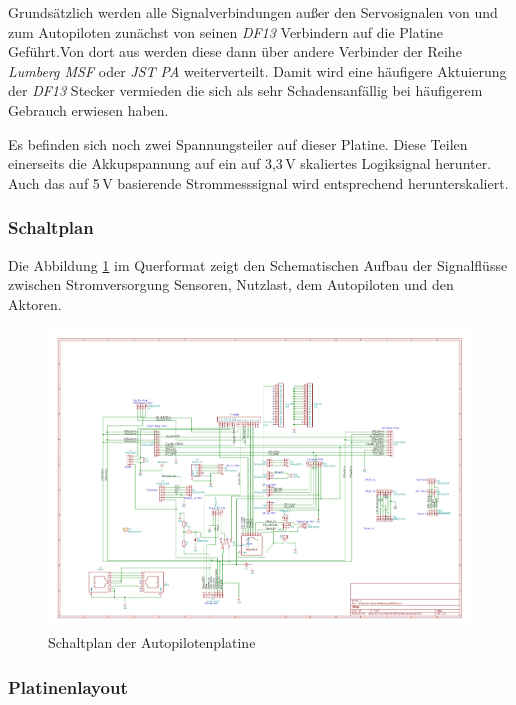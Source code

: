 Grundsätzlich werden alle Signalverbindungen außer den Servosignalen von und zum Autopiloten zunächst von seinen \textit{DF13} Verbindern auf die Platine Geführt.Von dort aus werden diese dann über andere Verbinder der Reihe \textit{Lumberg MSF} oder \textit{JST PA} weiterverteilt. Damit wird eine häufigere Aktuierung der \textit{DF13} Stecker vermieden die sich als sehr Schadensanfällig bei häufigerem Gebrauch erwiesen haben.

Es befinden sich noch zwei Spannungsteiler auf dieser Platine. Diese Teilen einerseits die Akkupspannung auf ein auf 3,3\,V skaliertes Logiksignal herunter. Auch das auf 5\,V basierende Strommesssignal wird entsprechend herunterskaliert.

\subsubsection{Schaltplan}

Die Abbildung \ref{fig:Schaltplan der Autopilotenplatine} im Querformat zeigt den Schematischen Aufbau der Signalflüsse zwischen Stromversorgung Sensoren, Nutzlast, dem Autopiloten und den Aktoren.


\begin{figure}[H]
\centering
\includegraphics[width=1.4\textwidth,angle =90]{bilder/Centerbox/Centerbox-Rear-Pixhawk_AUVSI16} 
\caption{Schaltplan der Autopilotenplatine} 
\label{fig:Schaltplan der Autopilotenplatine}
\end{figure}

\subsubsection{Platinenlayout}



